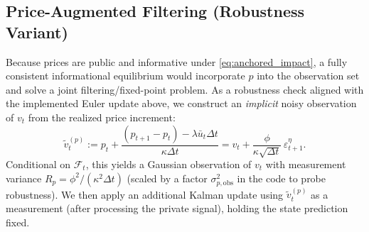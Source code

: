 \subsection{Price-Augmented Filtering (Robustness Variant)}
 
 Because prices are public and informative under \eqref{eq:anchored_impact}, a fully consistent informational equilibrium would incorporate $p$ into the observation set and solve a joint filtering/fixed-point problem. As a robustness check aligned with the implemented Euler update above, we construct an \emph{implicit} noisy observation of $v_t$ from the realized price increment:
 \[
 \tilde v^{(p)}_t
 := p_t+\frac{(p_{t+1}-p_t)-\lambda \bar u_t\Delta t}{\kappa\Delta t}
  = v_t+\frac{\phi}{\kappa\sqrt{\Delta t}}\,\varepsilon^\eta_{t+1}.
 \]
 Conditional on $\mathcal F_t$, this yields a Gaussian observation of $v_t$ with measurement variance
 $R_p=\phi^2/(\kappa^2\Delta t)$ (scaled by a factor $\sigma_{p,\mathrm{obs}}^2$ in the code to probe robustness). We then apply an additional Kalman update using $\tilde v^{(p)}_t$ as a measurement (after processing the private signal), holding the state prediction fixed.
